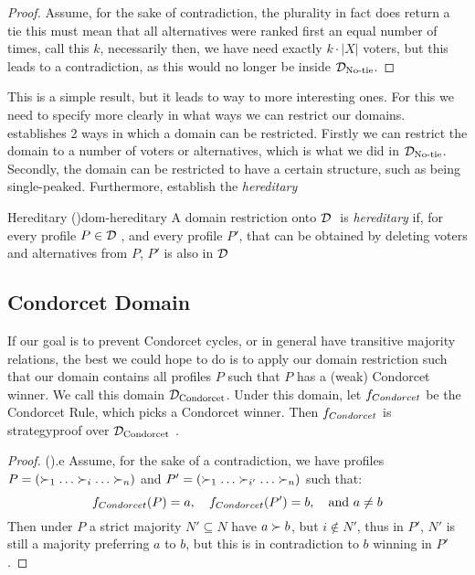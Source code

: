 \begin{proof}
	Assume, for the sake of contradiction, the plurality in fact does return a tie this must mean that all alternatives were ranked first an equal number of times, call this $k$, necessarily then, we have need exactly $k \cdot |X|$ voters, but this leads to a contradiction, as this would no longer be inside $\mathcal{D}_{\textnormal{No-tie}}$.
\end{proof}

This is a simple result, but it leads to way to more interesting ones. For this we need to specify more clearly in what ways we can restrict our domains. \citet{gaertnerChapter3Domain2002} establishes 2 ways in which a domain can be restricted. Firstly we can restrict the domain to a number of voters or alternatives, which is what we did in $\mathcal{D}_{\textnormal{No-tie}}$. Secondly, the domain can be restricted to have a certain structure, such as being single-peaked. Furthermore, \citet{elkindPreferenceRestrictionsComputational2022a} establish the \textit{hereditary}

\begin{definition}{Hereditary \textnormal{(\citet{elkindPreferenceRestrictionsComputational2022a})}}{dom-hereditary}
	A domain restriction onto $\mathcal{D}_{\textnormal{ }}$ is \textit{hereditary} if, for every profile $P \in \mathcal{D}_{\textnormal{ }}$, and every profile $P'$, that can be obtained by deleting voters and alternatives from $P$, $P'$ is also in $\mathcal{D}_{\textnormal{ }}$
\end{definition}

\subsection{Condorcet Domain}
If our goal is to prevent Condorcet cycles, or in general have transitive majority relations, the best we could hope to do is to apply our domain restriction such that our domain contains all profiles $P$ such that $P$ has a (weak) Condorcet winner. We call this domain $\mathcal{D}_{\textnormal{Condorcet}}$. Under this domain, let $f_{\normalfont{Condorcet}}$ be the Condorcet Rule, which picks a Condorcet winner. Then $f_{\normalfont{Condorcet}}$ is strategyproof over $\mathcal{D}_{\textnormal{Condorcet}}$ \citep{elkindPreferenceRestrictionsComputational2022a}.

\begin{proof}{(\citet{elkindPreferenceRestrictionsComputational2022a}).}e
	Assume, for the sake of a contradiction, we have profiles $P = (\pref_1 \dots \pref_i \dots \pref_n)$ and $P' = (\pref_1 \dots \pref_{i'} \dots \pref_n)$ such that:
	\[
		f_{\normalfont{Condorcet}}(P) = a, \quad f_{\normalfont{Condorcet}}(P') = b, \quad \text{and } a \neq b
	\]
	Then under $P$ a strict majority $N' \subseteq N$ have $a \succ b$, but $i \notin N'$, thus in $P'$, $N'$ is still a majority preferring $a$ to $b$, but this is in contradiction to $b$ winning in $P'$.
\end{proof}


